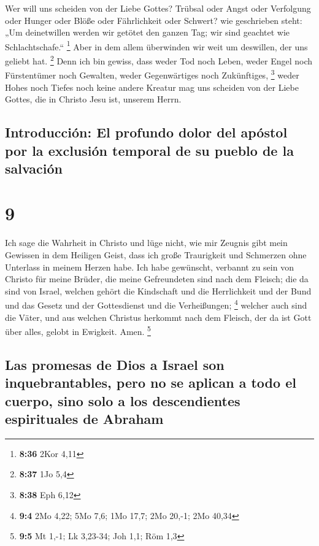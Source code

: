  Wer will uns scheiden von der Liebe Gottes? Trübsal oder
Angst oder Verfolgung oder Hunger oder Blöße oder Fährlichkeit oder
Schwert?  wie geschrieben steht: „Um deinetwillen werden
wir getötet den ganzen Tag; wir sind geachtet wie Schlachtschafe.``
\footnote{\textbf{8:36} 2Kor 4,11}  Aber in dem allem
überwinden wir weit um deswillen, der uns geliebt hat. \footnote{\textbf{8:37}
  1Jo 5,4}  Denn ich bin gewiss, dass weder Tod noch
Leben, weder Engel noch Fürstentümer noch Gewalten, weder Gegenwärtiges
noch Zukünftiges, \footnote{\textbf{8:38} Eph 6,12} 
weder Hohes noch Tiefes noch keine andere Kreatur mag uns scheiden von
der Liebe Gottes, die in Christo Jesu ist, unserem Herrn.

\hypertarget{introducciuxf3n-el-profundo-dolor-del-apuxf3stol-por-la-exclusiuxf3n-temporal-de-su-pueblo-de-la-salvaciuxf3n}{%
\subsection{Introducción: El profundo dolor del apóstol por la exclusión
temporal de su pueblo de la
salvación}\label{introducciuxf3n-el-profundo-dolor-del-apuxf3stol-por-la-exclusiuxf3n-temporal-de-su-pueblo-de-la-salvaciuxf3n}}

\hypertarget{section-8}{%
\section{9}\label{section-8}}

 Ich sage die Wahrheit in Christo und lüge nicht, wie mir
Zeugnis gibt mein Gewissen in dem Heiligen Geist,  dass
ich große Traurigkeit und Schmerzen ohne Unterlass in meinem Herzen
habe.  Ich habe gewünscht, verbannt zu sein von Christo
für meine Brüder, die meine Gefreundeten sind nach dem Fleisch;
 die da sind von Israel, welchen gehört die Kindschaft und
die Herrlichkeit und der Bund und das Gesetz und der Gottesdienst und
die Verheißungen; \footnote{\textbf{9:4} 2Mo 4,22; 5Mo 7,6; 1Mo 17,7;
  2Mo 20,-1; 2Mo 40,34}  welcher auch sind die Väter, und
aus welchen Christus herkommt nach dem Fleisch, der da ist Gott über
alles, gelobt in Ewigkeit. Amen. \footnote{\textbf{9:5} Mt 1,-1; Lk
  3,23-34; Joh 1,1; Röm 1,3}

\hypertarget{las-promesas-de-dios-a-israel-son-inquebrantables-pero-no-se-aplican-a-todo-el-cuerpo-sino-solo-a-los-descendientes-espirituales-de-abraham}{%
\subsection{Las promesas de Dios a Israel son inquebrantables, pero no
se aplican a todo el cuerpo, sino solo a los descendientes espirituales
de
Abraham}\label{las-promesas-de-dios-a-israel-son-inquebrantables-pero-no-se-aplican-a-todo-el-cuerpo-sino-solo-a-los-descendientes-espirituales-de-abraham}}

